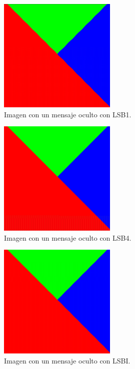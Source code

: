 \documentclass[a4paper,12pt]{article}
\def\FIG#1#2{%
	{\centering#1\par}
	#2}
\begin{document}
\begin{itemize}
\begin{itemize}
			\begin{figure}[h!]%
				\FIG{\includegraphics[width=0.5\textwidth]{tricolor_lsb1.png}}
				{\caption{Imagen con un mensaje oculto con LSB1.}
					\label{fig1}}
			\end{figure}
		
			\begin{figure}[h!]%
				\FIG{\includegraphics[width=0.5\textwidth]{tricolor_lsb4.png}}
				{\caption{Imagen con un mensaje oculto con LSB4.}
					\label{fig2}}
			\end{figure}
	
			\begin{figure}[h!]%
				\FIG{\includegraphics[width=0.5\textwidth]{tricolor_lsbi.png}}
				{\caption{Imagen con un mensaje oculto con LSBI.}
					\label{fig3}}
			\end{figure}
					

\end{itemize}
\end{itemize}
\end{document}
